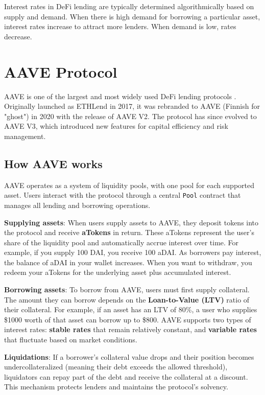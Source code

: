 Interest rates in DeFi lending are typically determined algorithmically based on supply and demand. When there is high demand for borrowing a particular asset, interest rates increase to attract more lenders. When demand is low, rates decrease.

\section{AAVE Protocol}

AAVE is one of the largest and most widely used DeFi lending protocols \cite{aaveV3docs}. Originally launched as ETHLend in 2017, it was rebranded to AAVE (Finnish for "ghost") in 2020 with the release of AAVE V2. The protocol has since evolved to AAVE V3, which introduced new features for capital efficiency and risk management.

\subsection{How AAVE works}

AAVE operates as a system of liquidity pools, with one pool for each supported asset. Users interact with the protocol through a central \texttt{Pool} contract that manages all lending and borrowing operations.

\textbf{Supplying assets}: When users supply assets to AAVE, they deposit tokens into the protocol and receive \textbf{aTokens} in return. These aTokens represent the user's share of the liquidity pool and automatically accrue interest over time. For example, if you supply 100 DAI, you receive 100 aDAI. As borrowers pay interest, the balance of aDAI in your wallet increases. When you want to withdraw, you redeem your aTokens for the underlying asset plus accumulated interest.

\textbf{Borrowing assets}: To borrow from AAVE, users must first supply collateral. The amount they can borrow depends on the \textbf{Loan-to-Value (LTV)} ratio of their collateral. For example, if an asset has an LTV of 80\%, a user who supplies \$1000 worth of that asset can borrow up to \$800. AAVE supports two types of interest rates: \textbf{stable rates} that remain relatively constant, and \textbf{variable rates} that fluctuate based on market conditions.

\textbf{Liquidations}: If a borrower's collateral value drops and their position becomes undercollateralized (meaning their debt exceeds the allowed threshold), liquidators can repay part of the debt and receive the collateral at a discount. This mechanism protects lenders and maintains the protocol's solvency.

